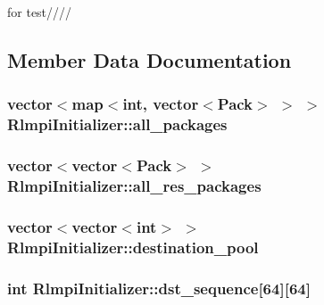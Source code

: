 for test//// 

\subsection{Member Data Documentation}
\hypertarget{classRlmpiInitializer_ac16520b366ee157679ca991889a2768b}{
\subsubsection[{all\_\-packages}]{\setlength{\rightskip}{0pt plus 5cm}vector$<$map$<$int, vector$<$Pack$>$ $>$ $>$ {\bf RlmpiInitializer::all\_\-packages}}}
\label{classRlmpiInitializer_ac16520b366ee157679ca991889a2768b}
\hypertarget{classRlmpiInitializer_ade747e8e8f35ccc1ce696396a1714a6e}{
\subsubsection[{all\_\-res\_\-packages}]{\setlength{\rightskip}{0pt plus 5cm}vector$<$vector$<$Pack$>$ $>$ {\bf RlmpiInitializer::all\_\-res\_\-packages}}}
\label{classRlmpiInitializer_ade747e8e8f35ccc1ce696396a1714a6e}
\hypertarget{classRlmpiInitializer_aa08fdf755099726e10c8d148d3c905cc}{
\subsubsection[{destination\_\-pool}]{\setlength{\rightskip}{0pt plus 5cm}vector$<$vector$<$int$>$ $>$ {\bf RlmpiInitializer::destination\_\-pool}}}
\label{classRlmpiInitializer_aa08fdf755099726e10c8d148d3c905cc}
\hypertarget{classRlmpiInitializer_a14302e2309ab3ce6da75f822d5ead6bc}{
\subsubsection[{dst\_\-sequence}]{\setlength{\rightskip}{0pt plus 5cm}int {\bf RlmpiInitializer::dst\_\-sequence}\mbox{[}64\mbox{]}\mbox{[}64\mbox{]}}}

